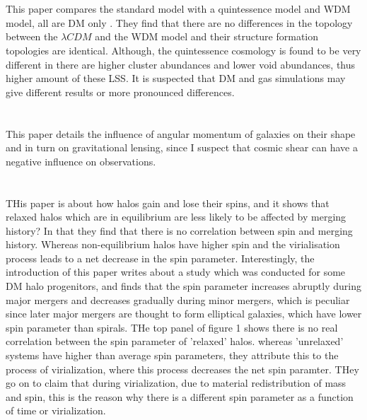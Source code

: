 \documentclass[fleqn,usenatbib]{mnras}
\begin{document}
\section{\citet{Watts_17}}
This paper compares the standard model with a quintessence model and WDM model, all are DM only . They find that there are no differences in the topology between the $\lambda CDM$ and the WDM model and their structure formation topologies are identical. Although, the quintessence cosmology is found to be very different in there are higher cluster abundances and lower void abundances, thus higher amount of these LSS. It is suspected that DM and gas simulations may give different results or more pronounced differences.

\section{\citet{Shafer_09}}
This paper details the influence of angular momentum of galaxies on their shape and in turn on gravitational lensing, since I suspect that cosmic shear can have a negative influence on observations.

\section{\citet{Donghia_08}}
THis paper is about how halos gain and lose their spins, and it shows that relaxed halos which are in equilibrium are less likely to be affected by merging history? In that they find that there is no correlation between spin and merging history. Whereas non-equilibrium halos have higher spin and the virialisation process leads to a net decrease in the spin parameter. Interestingly, the introduction of this paper writes about a study\citep{Vitvitska_02} which was conducted for some DM halo progenitors, and finds that the spin parameter increases abruptly during major mergers and decreases gradually during minor mergers, which is peculiar since later major mergers are thought to form elliptical galaxies, which have lower spin parameter than spirals. 
THe top panel of figure 1 shows there is no real correlation between the spin parameter of 'relaxed' halos. whereas 'unrelaxed' systems have higher than average spin parameters, they attribute this to the process of virialization, where this process decreases the net spin paramter. THey go on to claim that during virialization, due to material redistribution of mass and spin, this is the reason why there is a different spin parameter as a function of time or virialization. 
\end{document}
